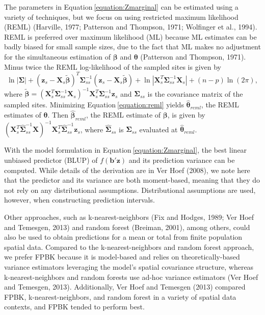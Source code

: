 \documentclass[]{elsarticle} %
\begin{document}
The parameters in Equation\(~\)\ref{equation:Zmarginal} can be estimated
using a variety of techniques, but we focus on using restricted maximum
likelihood (REML) (Harville, 1977; Patterson and Thompson, 1971;
Wolfinger et al., 1994). REML is preferred over maximum likelihood (ML)
because ML estimates can be badly biased for small sample sizes, due to
the fact that ML makes no adjustment for the simultaneous estimation of
\(\bm{\beta}\) and \(\bm{\theta}\) (Patterson and Thompson, 1971). Minus
twice the REML log-likelihood of the sampled sites is given by
\begin{equation}\label{equation:reml}
  \ln|\bm{\Sigma}| + (\bm{z}_s - \bm{X}_s \bm{\tilde{\beta}})^T \bm{\Sigma}_{ss}^{-1}(\bm{z}_s - \bm{X}_s \bm{\tilde{\beta}}) + \ln|\bm{X}_s^T \bm{\Sigma}_{ss}^{-1} \bm{X}_s| + (n - p) \ln(2 \pi) ,
\end{equation} where
\(\bm{\tilde{\beta}} = (\bm{X}_s^T \bm{\Sigma}_{ss}^{-1} \bm{X}_s)^{-1} \bm{X}_s^T \bm{\Sigma}_{ss}^{-1} \bm{z}_s\)
and \(\bm{\Sigma}_{ss}\) is the covariance matrix of the sampled sites.
Minimizing Equation\(~\)\ref{equation:reml} yields
\(\bm{\hat{\theta}}_{reml}\), the REML estimates of \(\bm{\theta}\).
Then \(\bm{\hat{\beta}}_{reml}\), the REML estimate of \(\bm{\beta}\),
is given by
\((\bm{X}_s^T \bm{\hat{\Sigma}}_{ss}^{-1} \bm{X})^{-1} \bm{X}_s^T \bm{\hat{\Sigma}}_{ss}^{-1} \bm{z}_s\),
where \(\bm{\hat{\Sigma}}_{ss}\) is \(\bm{\Sigma}_{ss}\) evaluated at
\(\bm{\hat{\theta}}_{reml}\).

With the model formulation in Equation\(~\)\ref{equation:Zmarginal}, the
best linear unbiased predictor (BLUP) of \(f(\mathbf{b}'\mathbf{z})\)
and its prediction variance can be computed. While details of the
derivation are in Ver Hoef (2008), we note here that the predictor and
its variance are both moment-based, meaning that they do not rely on any
distributional assumptions. Distributional assumptions are used,
however, when constructing prediction intervals.

Other approaches, such as k-nearest-neighbors (Fix and Hodges, 1989; Ver
Hoef and Temesgen, 2013) and random forest (Breiman, 2001), among
others, could also be used to obtain predictions for a mean or total
from finite population spatial data. Compared to the k-nearest-neighbors
and random forest approach, we prefer FPBK because it is model-based and
relies on theoretically-based variance estimators leveraging the model's
spatial covariance structure, whereas k-nearest-neighbors and random
forests use ad-hoc variance estimators (Ver Hoef and Temesgen, 2013).
Additionally, Ver Hoef and Temesgen (2013) compared FPBK,
k-nearest-neighbors, and random forest in a variety of spatial data
contexts, and FPBK tended to perform best.
\end{document}
